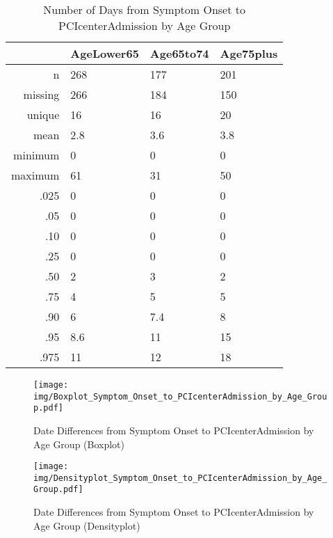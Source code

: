 \documentclass[a4paper]{report}
\begin{document}
\begin{itemize}
{%
\begin{table}[ht]
\centering
\begin{tabular}{rlll}
  \toprule
 & AgeLower65 & Age65to74 & Age75plus \\ 
  \midrule
n & 268 & 177 & 201 \\ 
  missing & 266 & 184 & 150 \\ 
  unique & 16 & 16 & 20 \\ 
  mean & 2.8 & 3.6 & 3.8 \\ 
  minimum & 0 & 0 & 0 \\ 
  maximum & 61 & 31 & 50 \\ 
  .025 & 0 & 0 & 0 \\ 
  .05 & 0 & 0 & 0 \\ 
  .10 & 0 & 0 & 0 \\ 
  .25 & 0 & 0 & 0 \\ 
  .50 & 2 & 3 & 2 \\ 
  .75 & 4 & 5 & 5 \\ 
  .90 & 6 & 7.4 & 8 \\ 
  .95 & 8.6 & 11 & 15 \\ 
  .975 & 11 & 12 & 18 \\ 
   \bottomrule
\end{tabular}
\caption{Number of Days from Symptom Onset to PCIcenterAdmission by Age Group} 
\end{table}
\begin{figure}
  \centering
  \caption{Date Differences from Symptom Onset to PCIcenterAdmission by Age Group (Boxplot)}
  \label{Boxplot: Date Differences from Symptom Onset to PCIcenterAdmission by Age Group}
\texttt{[image: img/Boxplot\_Symptom\_Onset\_to\_PCIcenterAdmission\_by\_Age\_Group.pdf]}\end{figure}


\begin{figure}
  \centering
  \caption{Date Differences from Symptom Onset to PCIcenterAdmission by Age Group (Densityplot)}
  \label{Density: Date Differences from Symptom Onset to PCIcenterAdmission by Age Group}
\texttt{[image: img/Densityplot\_Symptom\_Onset\_to\_PCIcenterAdmission\_by\_Age\_Group.pdf]}\end{figure}


\clearpage

}
\end{itemize}
\end{document}
